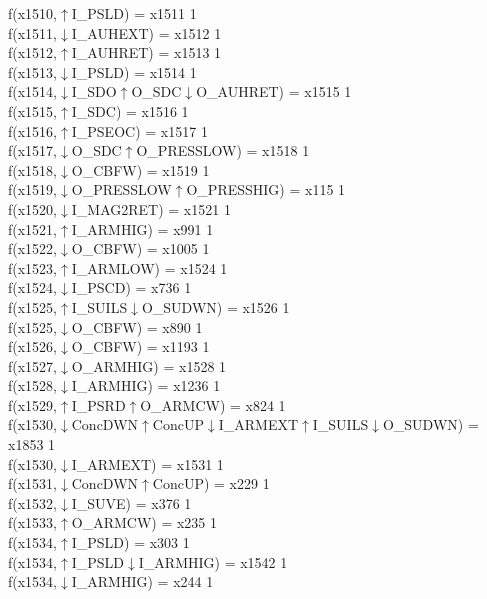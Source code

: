 f(x1510,$\uparrow$I\_PSLD) = x1511 {1} \\
f(x1511,$\downarrow$I\_AUHEXT) = x1512 {1} \\
f(x1512,$\uparrow$I\_AUHRET) = x1513 {1} \\
f(x1513,$\downarrow$I\_PSLD) = x1514 {1} \\
f(x1514,$\downarrow$I\_SDO$\uparrow$O\_SDC$\downarrow$O\_AUHRET) = x1515 {1} \\
f(x1515,$\uparrow$I\_SDC) = x1516 {1} \\
f(x1516,$\uparrow$I\_PSEOC) = x1517 {1} \\
f(x1517,$\downarrow$O\_SDC$\uparrow$O\_PRESSLOW) = x1518 {1} \\
f(x1518,$\downarrow$O\_CBFW) = x1519 {1} \\
f(x1519,$\downarrow$O\_PRESSLOW$\uparrow$O\_PRESSHIG) = x115 {1} \\
f(x1520,$\downarrow$I\_MAG2RET) = x1521 {1} \\
f(x1521,$\uparrow$I\_ARMHIG) = x991 {1} \\
f(x1522,$\downarrow$O\_CBFW) = x1005 {1} \\
f(x1523,$\uparrow$I\_ARMLOW) = x1524 {1} \\
f(x1524,$\downarrow$I\_PSCD) = x736 {1} \\
f(x1525,$\uparrow$I\_SUILS$\downarrow$O\_SUDWN) = x1526 {1} \\
f(x1525,$\downarrow$O\_CBFW) = x890 {1} \\
f(x1526,$\downarrow$O\_CBFW) = x1193 {1} \\
f(x1527,$\downarrow$O\_ARMHIG) = x1528 {1} \\
f(x1528,$\downarrow$I\_ARMHIG) = x1236 {1} \\
f(x1529,$\uparrow$I\_PSRD$\uparrow$O\_ARMCW) = x824 {1} \\
f(x1530,$\downarrow$ConcDWN$\uparrow$ConcUP$\downarrow$I\_ARMEXT$\uparrow$I\_SUILS$\downarrow$O\_SUDWN) = x1853 {1} \\
f(x1530,$\downarrow$I\_ARMEXT) = x1531 {1} \\
f(x1531,$\downarrow$ConcDWN$\uparrow$ConcUP) = x229 {1} \\
f(x1532,$\downarrow$I\_SUVE) = x376 {1} \\
f(x1533,$\uparrow$O\_ARMCW) = x235 {1} \\
f(x1534,$\uparrow$I\_PSLD) = x303 {1} \\
f(x1534,$\uparrow$I\_PSLD$\downarrow$I\_ARMHIG) = x1542 {1} \\
f(x1534,$\downarrow$I\_ARMHIG) = x244 {1} \\
